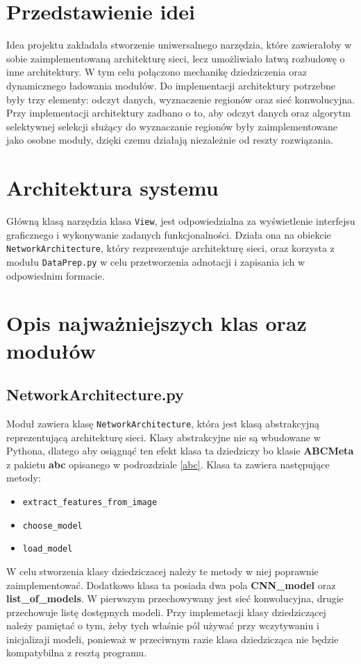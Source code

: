 \documentclass[a4paper,twoside,12pt]{book}
\begin{document}
{\section{Przedstawienie idei}
{Idea projektu zakładała stworzenie uniwersalnego narzędzia, które zawierałoby w sobie zaimplementowaną architekturę sieci, lecz umożliwiało łatwą rozbudowę o inne architektury. W tym celu połączono mechanikę dziedziczenia oraz dynamicznego ładowania modułów. Do implementacji architektury potrzebne były trzy elementy: odczyt danych, wyznaczenie regionów oraz sieć konwolucyjna. Przy implementacji architektury zadbano o to, aby odczyt danych oraz algorytm selektywnej selekcji służący do wyznaczanie regionów były zaimplementowane jako osobne moduły, dzięki czemu działają niezależnie od reszty rozwiązania.}
\section{Architektura systemu}
{Główną klasą narzędzia klasa \lstinline|View|,  jest odpowiedzialna za wyświetlenie interfejsu graficznego i wykonywanie zadanych funkcjonalności. Działa ona na obiekcie \lstinline|NetworkArchitecture|, który rezprezentuje architekturę sieci, oraz korzysta z modułu \lstinline|DataPrep.py| w celu przetworzenia adnotacji i zapisania ich w odpowiednim formacie.}
\section{Opis najważniejszych klas oraz modułów}
\subsection{NetworkArchitecture.py}
{Moduł zawiera klasę \lstinline|NetworkArchitecture|, która jest klasą abstrakcyjną reprezentującą architekturę sieci. Klasy abstrakcyjne nie są wbudowane w Pythona, dlatego aby osiągnąć ten efekt klasa ta dziedziczy bo klasie \textbf{ABCMeta} z pakietu \textbf{abc} opisanego w podrozdziale \ref{abc}. Klasa ta zawiera następujące metody:}
\begin{itemize}
\item {\lstinline|extract_features_from_image|}
\item{\lstinline|choose_model|}
\item{\lstinline|load_model|}
\end{itemize}
{W celu stworzenia klasy dziedziczacej należy te metody w niej poprawnie zaimplementować. Dodatkowo klasa ta posiada dwa pola \textbf{CNN\_model} oraz \textbf{list\_of\_models}. W pierwszym przechowywany jest sieć konwolucyjna, drugie przechowuje listę dostępnych modeli. Przy implemetacji klasy dziedziczącej należy pamiętać o tym, żeby tych właśnie pól używać przy wczytywaniu i inicjalizaji modeli, ponieważ w przeciwnym razie klasa dziedzicząca nie będzie kompatybilna z resztą programu.}

}
\end{document}
